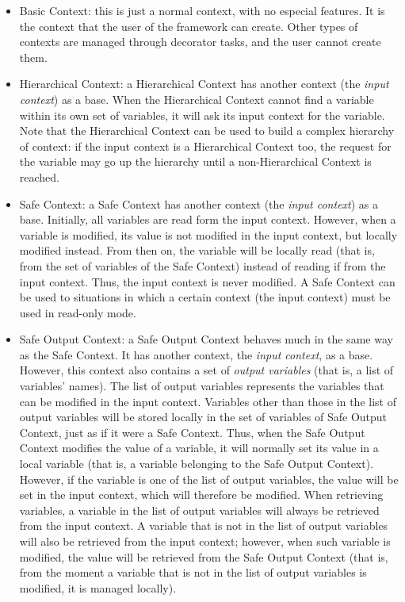 \documentclass[a4paper]{article}
\begin{document}
\begin{itemize}
    \item Basic Context: this is just a normal context, with no especial features. It is the context that the user of the framework can create. Other types of contexts are managed through decorator tasks, and the user cannot create them.
    \item Hierarchical Context: a Hierarchical Context has another context (the \textit{input context}) as a base. When the Hierarchical Context cannot find a variable within its own set of variables, it will ask its input context for the variable. Note that the Hierarchical Context can be used to build a complex hierarchy of context: if the input context is a Hierarchical Context too, the request for the variable may go up the hierarchy until a non-Hierarchical Context is reached.
    \item Safe Context: a Safe Context has another context (the \textit{input context}) as a base. Initially, all variables are read form the input context. However, when a variable is modified, its value is not modified in the input context, but locally modified instead. From then on, the variable will be locally read (that is, from the set of variables of the Safe Context) instead of reading if from the input context. Thus, the input context is never modified. A Safe Context can be used to situations in which a certain context (the input context) must be used in read-only mode.
    \item Safe Output Context: a Safe Output Context behaves much in the same way as the Safe Context. It has another context, the \textit{input context}, as a base. However, this context also contains a set of \textit{output variables} (that is, a list of variables' names). The list of output variables represents the variables that can be modified in the input context. Variables other than those in the list of output variables will be stored locally in the set of variables of Safe Output Context, just as if it were a Safe Context. Thus, when the Safe Output Context modifies the value of a variable, it will normally set its value in a local variable (that is, a variable belonging to the Safe Output Context). However, if the variable is one of the list of output variables, the value will be set in the input context, which will therefore be modified. When retrieving variables, a variable in the list of output variables will always be retrieved from the input context. A variable that is not in the list of output variables will also be retrieved from the input context; however, when such variable is modified, the value will be retrieved from the Safe Output Context (that is, from the moment a variable that is not in the list of output variables is modified, it is managed locally).
\end{itemize}
\end{document}
